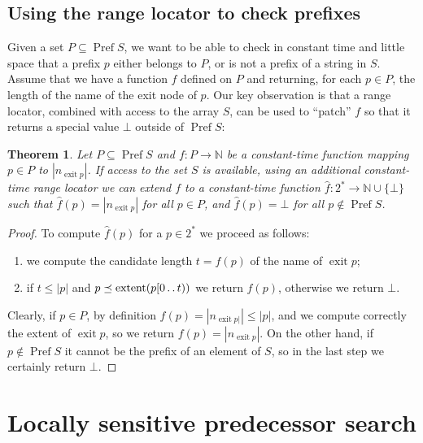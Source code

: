 \documentclass[a4paper,11pt]{article}
\newtheorem{theorem} {Theorem}[section]
\newcommand{\N}{\mathbb{N}}
\newcommand{\?}{\mskip1.5mu}
\def\..{\,\mathpunct{\ldotp\ldotp}} %
\DeclareMathOperator{\exit}{exit}
\DeclareMathOperator{\extent}{extent}
\DeclareMathOperator{\Pref}{Pref}
\begin{document}
\subsection{Using the range locator to check prefixes}

Given a set $P\subseteq \Pref S$, we want to be able to check in constant time
and little space that a prefix $p$ either belongs to $P$, or is not a prefix of a string in $S$. Assume that we have a function $f$ 
defined on $P$ and returning, for each $p\in P$, the length of the name of the exit node of $p$. 
Our key observation is that a range locator, combined with access to the array $S$, can be used to ``patch''
$f$ so that it returns a special value $\bot$ outside of $\Pref S$:
\begin{theorem}
\label{th:pref}
Let $P\subseteq\Pref S$ and $f: P\to \N$ be a constant-time function mapping
$p\in P$ to $|n_{\exit p}|$. If access to the set $S$ is available, using an additional
constant-time range locator we can extend $f$ to a constant-time function $\hat f:2^*\to \N
\cup\{\bot\}$ such that $\hat f(p)=|n_{\exit p}|$ for all $p \in P$, and $\hat f(p)=\bot$ for
all $p \not\in\Pref S$.
\end{theorem}
\begin{proof}
To compute $\hat f(p)$ for a $p\in 2^*$ we proceed as follows:
\begin{enumerate}
  \item we compute the candidate length $t=f(p)$ of the name of $\exit p$;
  \item if $t\leq |p|$ and $p\preceq \extent(p[0\..t))$ we return $f(p)$,
  otherwise we return $\bot$.
\end{enumerate}
Clearly, if $p\in P$, by definition $f(p)=|n_{\exit p|}|\leq |p|$, and we
compute correctly the extent of $\exit p$, so we return $f(p)=|n_{\exit p}|$.
On the other hand, if $p \not\in \Pref S$ it cannot be the prefix of an element
of $S$, so in the last step we certainly return $\bot$.
\end{proof}


\section{Locally sensitive predecessor search}
\label{sec:pred}
\end{document}
